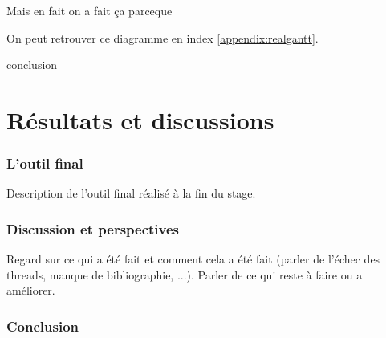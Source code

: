 \documentclass[a4paper]{article}
\begin{document}

Mais en fait on a fait ça parceque

On peut retrouver ce diagramme en index \ref{appendix:realgantt}.


conclusion

\clearpage
\part{Résultats et discussions}

\section{L'outil final}

Description de l'outil final réalisé à la fin du stage.

\clearpage

\section{Discussion et perspectives}

Regard sur ce qui a été fait et comment cela a été fait (parler de l'échec
des threads, manque de bibliographie, ...). Parler de ce qui reste à faire ou a
améliorer.

\clearpage

\section*{Conclusion}
\end{document}
